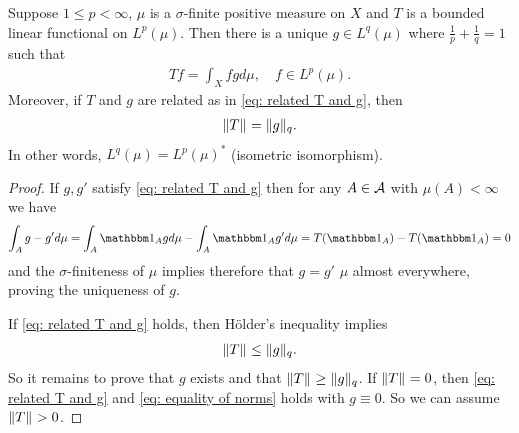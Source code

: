 \documentclass[../../main.tex]{subfiles}
\begin{document}
\begin{theorem}\label{thm: p dual of q}
Suppose $1\le p < \infty$, $\mu$ is a $\sigma$-finite positive measure on $X$ and $T$ is a bounded linear functional on $L^{p}(\mu)$. Then there is a unique $g\in L^{q}(\mu)$ where $\frac{1}{p}+\frac{1}{q}=1$ such that
\begin{align}
	Tf=\int_{X}fgd\mu, \quad f\in L^{p}(\mu). \label{eq: related T and g}
\end{align}
Moreover, if $T$ and $g$ are related as in \eqref{eq: related T and g}, then
\begin{align}
	\norm{T}=\norm[q]{g}. \label{eq: equality of norms}
\end{align}
In other words, $L^{q}(\mu)=L^{p}(\mu)^{*}$ (isometric isomorphism).
\end{theorem}
\begin{proof}
If $g,g'$ satisfy \eqref{eq: related T and g} then for any $A\in \m{A}$ with $\mu(A)<\infty$ we have 
\begin{align*}
	\int_{A}g-g'd\mu=\int_{A}\ind{A}gd\mu-\int_{A}\ind{A}g'd\mu=T(\ind{A})-T(\ind{A})=0
\end{align*}
and the $\sigma$-finiteness of $\mu$ implies therefore that $g=g'$ $\mu$ almost everywhere, proving the uniqueness of $g$.

If \eqref{eq: related T and g} holds, then Hölder's inequality implies
\begin{align*}
	\norm{T}\le \norm[q]{g}.
\end{align*}
So it remains to prove that $g$ exists and that $\norm{T}\ge \norm[q]{g}$. If $\norm{T}=0$, then \eqref{eq: related T and g} and \eqref{eq: equality of norms} holds with $g\equiv 0$. So we can assume $\norm{T}>0$.


\end{proof}
\end{document}
